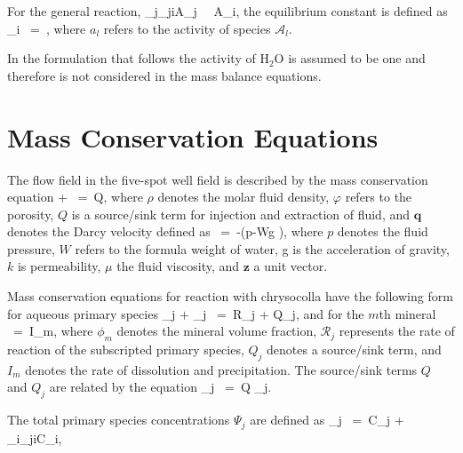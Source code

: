 \documentclass[12pt]{article}
\def\EQ#1\EN{\begin{equation}#1\end{equation}}
\def\BA#1\EA{\begin{align}#1\end{align}}
\newcommand{\eq}{\ =\ }
\newcommand{\p}{{\partial}}
\newcommand{\A}{{\mathcal A}}
\newcommand{\R}{{{\mathcal R}}}
\newcommand{\bnabla}{\boldsymbol{\nabla}}
\newcommand{\bOmega}{\boldsymbol{\Omega}}
\newcommand{\bq}{\boldsymbol{q}}
\newcommand{\bz}{\boldsymbol{z}}
\newcommand{\arrows}{~\rightleftharpoons~}
\begin{document}
\noindent
For the general reaction, 
\EQ
\sum_j\nu_{ji}\A_j \arrows \A_i,
\EN
the equilibrium constant is defined as
\EQ
K_i \eq {},
\EN
where $a_l$ refers to the activity of species $\A_l$.

\noindent
In the formulation that follows the activity of H$_2$O is assumed to be one and therefore is not considered in the mass balance equations.

\section{Mass Conservation Equations}

The flow field in the five-spot well field is described by the mass conservation equation
\EQ
\frac{\p}{\p t} \varphi \rho + \bnabla\cdot\bq\rho \eq Q,
\EN
where $\rho$ denotes the molar fluid density, $\varphi$ refers to the porosity, $Q$ is a source/sink term for injection and extraction of fluid, and $\bq$ denotes the Darcy velocity defined as
\EQ
\bq \eq -\big(\bnabla p-W\rho g \bz\big),
\EN
where $p$ denotes the fluid pressure, $W$ refers to the formula weight of water, g is the acceleration of gravity, $k$ is permeability, $\mu$ the fluid viscosity,  and 
$\bz$ 
a unit vector.

Mass conservation equations for reaction with chrysocolla have the following form for aqueous primary species
\EQ
\frac{\p}{\p t} \varphi\Psi_j + \bnabla\cdot\bOmega_j \eq \R_j + Q_j,
\EN
and for the $m$th mineral
\EQ
\frac{\p\phi_{m}}{\p t} \eq I_{m},
\EN
where $\phi_{m}$ denotes the mineral volume fraction, $\R_j$ represents the rate of reaction of the subscripted primary species, $Q_j$ denotes a source/sink term, and $I_{m}$ denotes the rate of dissolution and precipitation.
The source/sink terms $Q$ and $Q_j$ are related by the equation
\EQ
Q_j \eq Q \Psi_j.
\EN

The total primary species concentrations $\Psi_j$ are defined as
\EQ
\Psi_j \eq C_j + \sum_i\nu_{ji}C_i,
\EN

\begin{comment}
\begin{subequations}
\BA
\Psi_{\rm Ca^{2+}} &\eq C_{\rm Ca^{2+}} + C_{\rm CaCO_{3(aq)}} + C_{\rm CaHCO_3^-},\\
\Psi_{\rm HCO_3^-} &\eq C_{\rm HCO_3^-} + C_{\rm CO_3^{2-}} + C_{\rm CO_{2(aq)}} + C_{\rm CaCO_{3(aq)}} + C_{\rm CaHCO_3^-} ,\\
\Psi_{\rm H^+} &\eq C_{\rm H^+} - C_{\rm OH^-}
\EA
\end{subequations}
\end{comment}
\end{document}
